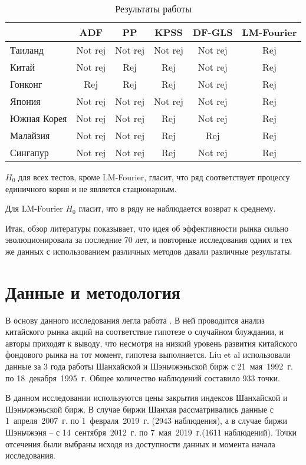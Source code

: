 \documentclass[a4paper,12pt]{article}
\begin{document}
\begin{table}
\centering
\caption{Результаты работы \cite{Wang2015}}
\label{tab:wang}
\begin{tabular}{|l|c|c|c|c|c|}
\hline
 & ADF & PP & KPSS & DF-GLS & LM-Fourier \\ \hline
Таиланд & Not rej & Not rej & Not rej & Not rej & Rej \\ \hline
Китай & Not rej & Rej & Rej & Not rej & Rej \\ \hline
Гонконг & Rej & Rej & Rej & Not rej & Rej \\ \hline
Япония & Not rej & Not rej & Not rej & Not rej & Rej \\ \hline
Южная Корея & Not rej & Not rej & Rej & Not rej & Rej \\ \hline
Малайзия & Not rej & Not rej & Rej & Rej & Rej \\ \hline
Сингапур & Not rej & Not rej & Rej & Not rej & Rej \\ \hline
\end{tabular}

{\raggedright \par $H_0$ для всех тестов, кроме LM-Fourier, гласит, что ряд соответствует процессу единичного корня и не является стационарным.}

{\raggedright \par Для LM-Fourier $H_0$ гласит, что в ряду не наблюдается возврат к среднему.}
\end{table}

Итак, обзор литературы показывает, что идея об эффективности рынка сильно эволюционировала за последние 70 лет, и повторные исследования одних и тех же данных с использованием различных методов давали различные результаты.

\newpage
\section{Данные и методология}\label{sec:meth}

В основу данного исследования легла работа \cite{Liu1997}. В ней проводится анализ китайского рынка акций на соответствие гипотезе о случайном блуждании, и авторы приходят к выводу, что несмотря на низкий уровень развития китайского фондового рынка на тот момент, гипотеза выполняется. Liu et al использовали данные за 3 года работы Шанхайской и Шэньчжэньской бирж с 21~мая~1992~г. по 18~декабря~1995~г. Общее количество наблюдений составило 933 точки.

В данном исследовании используются цены закрытия индексов Шанхайской и Шэньчжэньской бирж. В случае биржи Шанхая рассматривались данные с 1~апреля~2007~г. по 1~февраля~2019~г. (2943 наблюдения), а в случае биржи Шэньчжэня -- с 14~сентября~2012~г. по 7~мая~2019~г.(1611 наблюдений). Точки отсечения были выбраны исходя из доступности данных и момента начала исследования.
\end{document}
